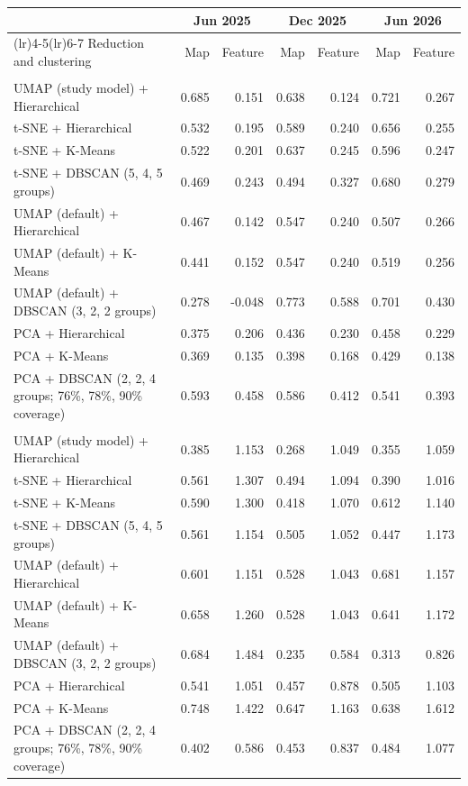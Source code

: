 \begin{tabularx}{\linewidth}{@{}>{\raggedright\arraybackslash}X rr rr rr@{}}
\toprule
 & \multicolumn{2}{c}{Jun 2025} & \multicolumn{2}{c}{Dec 2025} & \multicolumn{2}{c}{Jun 2026} \\
\cmidrule(lr){2-3}\cmidrule(lr){4-5}\cmidrule(lr){6-7}
Reduction and clustering & Map & Feature & Map & Feature & Map & Feature \\
\midrule
\multicolumn{7}{@{}l}{\textit{Silhouette (higher is better)}} \\
UMAP (study model) + Hierarchical & 0.685 & 0.151 & 0.638 & 0.124 & 0.721 & 0.267 \\
t-SNE + Hierarchical & 0.532 & 0.195 & 0.589 & 0.240 & 0.656 & 0.255 \\
t-SNE + K-Means & 0.522 & 0.201 & 0.637 & 0.245 & 0.596 & 0.247 \\
t-SNE + DBSCAN (5, 4, 5 groups) & 0.469 & 0.243 & 0.494 & 0.327 & 0.680 & 0.279 \\
UMAP (default) + Hierarchical & 0.467 & 0.142 & 0.547 & 0.240 & 0.507 & 0.266 \\
UMAP (default) + K-Means & 0.441 & 0.152 & 0.547 & 0.240 & 0.519 & 0.256 \\
UMAP (default) + DBSCAN (3, 2, 2 groups) & 0.278 & -0.048 & 0.773 & 0.588 & 0.701 & 0.430 \\
PCA + Hierarchical & 0.375 & 0.206 & 0.436 & 0.230 & 0.458 & 0.229 \\
PCA + K-Means & 0.369 & 0.135 & 0.398 & 0.168 & 0.429 & 0.138 \\
PCA + DBSCAN (2, 2, 4 groups; 76\%, 78\%, 90\% coverage) & 0.593 & 0.458 & 0.586 & 0.412 & 0.541 & 0.393 \\
\midrule
\multicolumn{7}{@{}l}{\textit{Davies--Bouldin (lower is better)}} \\
UMAP (study model) + Hierarchical & 0.385 & 1.153 & 0.268 & 1.049 & 0.355 & 1.059 \\
t-SNE + Hierarchical & 0.561 & 1.307 & 0.494 & 1.094 & 0.390 & 1.016 \\
t-SNE + K-Means & 0.590 & 1.300 & 0.418 & 1.070 & 0.612 & 1.140 \\
t-SNE + DBSCAN (5, 4, 5 groups) & 0.561 & 1.154 & 0.505 & 1.052 & 0.447 & 1.173 \\
UMAP (default) + Hierarchical & 0.601 & 1.151 & 0.528 & 1.043 & 0.681 & 1.157 \\
UMAP (default) + K-Means & 0.658 & 1.260 & 0.528 & 1.043 & 0.641 & 1.172 \\
UMAP (default) + DBSCAN (3, 2, 2 groups) & 0.684 & 1.484 & 0.235 & 0.584 & 0.313 & 0.826 \\
PCA + Hierarchical & 0.541 & 1.051 & 0.457 & 0.878 & 0.505 & 1.103 \\
PCA + K-Means & 0.748 & 1.422 & 0.647 & 1.163 & 0.638 & 1.612 \\
PCA + DBSCAN (2, 2, 4 groups; 76\%, 78\%, 90\% coverage) & 0.402 & 0.586 & 0.453 & 0.837 & 0.484 & 1.077 \\
\bottomrule
\end{tabularx}
